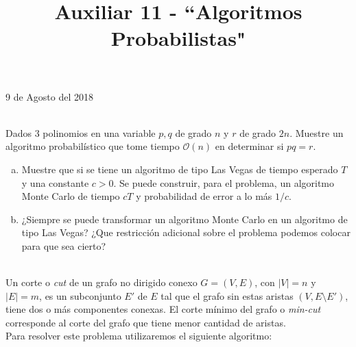\documentclass[dcc,uchile]{fcfmcourse}
\title{Auxiliar 11 - ``Algoritmos Probabilistas"}
\theoremstyle{plain}
\theoremstyle{definition}
\begin{document}
\maketitle
\begin{center}
9 de Agosto del 2018
\end{center}
\vspace{-1ex}


\begin{problems}
\\
Dados 3 polinomios en una variable $p, q$ de grado $n$ y $r$ de grado $2n$. Muestre un algoritmo probabilístico que tome tiempo $\mathcal{O}(n)$ en determinar si $pq = r$.

\begin{enumerate}[a)]
    \item Muestre que si se tiene un algoritmo de tipo Las Vegas de tiempo esperado $T$ y una constante $c>0$. Se puede construir, para el problema, un algoritmo Monte Carlo de tiempo $cT$ y probabilidad de error a lo más $1/c$.
    \item ¿Siempre se puede transformar un algoritmo Monte Carlo en un algoritmo de tipo Las Vegas? ¿Que restricción adicional sobre el problema podemos colocar para que sea cierto?
\end{enumerate}

\\
Un corte o \textit{cut} de un grafo no dirigido conexo $G = (V, E)$, con $|V| = n$ y $|E| = m$, es un subconjunto $E'$ de $E$ tal que el grafo sin estas aristas $(V, E \setminus E')$, tiene dos o más componentes conexas. El corte mínimo del grafo o \textit{min-cut} corresponde al corte del grafo que tiene menor cantidad de aristas. \\

Para resolver este problema utilizaremos el siguiente algoritmo:\\


\end{problems}
\end{document}
